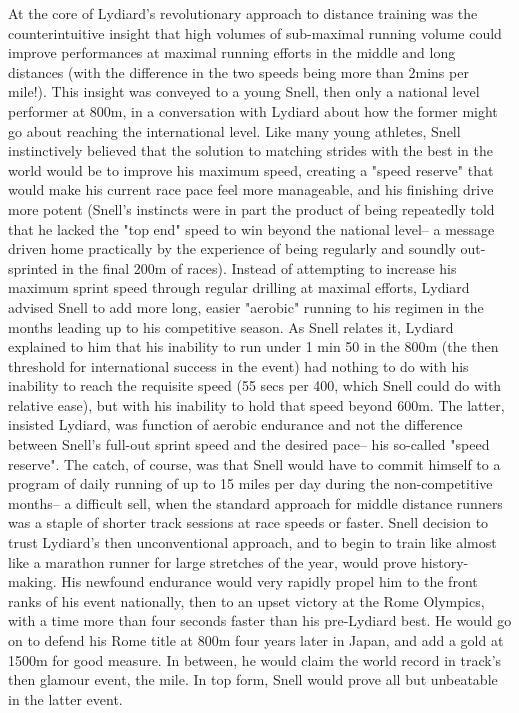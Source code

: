 At the core of Lydiard's revolutionary approach to distance training was the counterintuitive insight that high volumes of sub-maximal running volume could improve performances at maximal running efforts in the middle and long distances (with the difference in the two speeds being more than 2mins per mile!). This insight was conveyed to a young Snell, then only a national level performer at 800m, in a conversation with Lydiard about how the former might go about reaching the international level. Like many young athletes, Snell instinctively believed that the solution to matching strides with the best in the world would be to improve his maximum speed, creating a "speed reserve" that would make his current race pace feel more manageable, and his finishing drive more potent (Snell's instincts were in part the product of being repeatedly told that he lacked the "top end" speed to win beyond the national level-- a message driven home practically by the experience of being regularly and soundly out-sprinted in the final 200m of races). Instead of attempting to increase his maximum sprint speed through regular drilling at maximal efforts, Lydiard advised Snell to add more long, easier "aerobic" running to his regimen in the months leading up to his competitive season. As Snell relates it, Lydiard explained to him that his inability to run under 1 min 50 in the 800m (the then threshold for international success in the event) had nothing to do with his inability to reach the requisite speed (55 secs per 400, which Snell could do with relative ease), but with his inability to hold that speed beyond 600m. The latter, insisted Lydiard, was function of aerobic endurance and not the difference between Snell's full-out sprint speed and the desired pace-- his so-called "speed reserve". The catch, of course, was that Snell would have to commit himself to a program of daily running of up to 15 miles per day during the non-competitive months-- a difficult sell, when the standard approach for middle distance runners was a staple of shorter track sessions at race speeds or faster. Snell decision to trust Lydiard's then unconventional approach, and to begin to train like almost like a marathon runner for large stretches of the year, would prove history-making. His newfound endurance would very rapidly propel him to the front ranks of his event nationally, then to an upset victory at the Rome Olympics, with a time more than four seconds faster than his pre-Lydiard best. He would go on to defend his Rome title at 800m four years later in Japan, and add a gold at 1500m for good measure. In between, he would claim the world record in track's then glamour event, the mile. In top form, Snell would prove all but unbeatable in the latter event.

